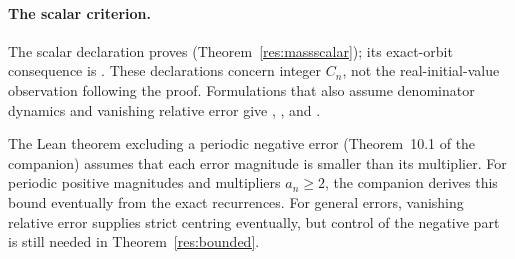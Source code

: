 \documentclass[11pt]{article}
\begin{document}
\paragraph{The scalar criterion.}
The scalar declaration proves 
(Theorem~\ref{res:massscalar});
its exact-orbit consequence is .
These declarations concern integer $C_n$, not the real-initial-value
observation following the proof. Formulations that also assume denominator
dynamics and vanishing relative error give ,
,
and .

The Lean theorem excluding a periodic negative error (Theorem~10.1 of the
companion) assumes that each error magnitude is smaller
than its multiplier. For periodic positive magnitudes and multipliers
$a_n\ge2$, the companion derives this bound eventually from the exact
recurrences. For general errors, vanishing relative error supplies
strict centring eventually, but control of the negative part is still
needed in Theorem~\ref{res:bounded}.

\end{document}
